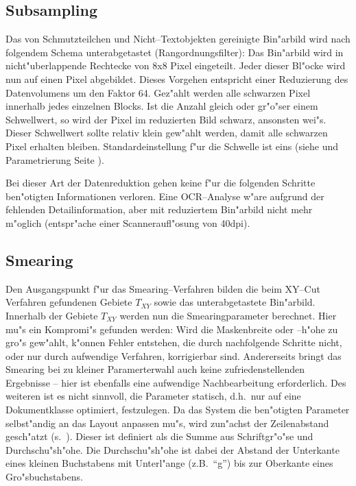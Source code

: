 
\subsection{Subsampling}
Das von Schmutzteilchen und Nicht--Textobjekten gereinigte Bin"arbild wird nach folgendem
Schema unterabgetastet (Rangordnungsfilter):
Das Bin"arbild wird in nicht"uberlappende Rechtecke von 8x8 Pixel eingeteilt.
Jeder dieser Bl"ocke wird nun auf einen Pixel abgebildet. Dieses Vorgehen entspricht einer
Reduzierung des Datenvolumens um den Faktor 64. Gez"ahlt werden alle schwarzen Pixel
innerhalb jedes einzelnen Blocks. Ist die Anzahl gleich oder gr"o"ser einem Schwellwert,
so wird der Pixel im reduzierten Bild schwarz, ansonsten wei"s.
Dieser Schwellwert sollte relativ klein gew"ahlt werden, damit alle schwarzen Pixel
erhalten bleiben. Standardeinstellung f"ur die Schwelle ist eins (siehe 
und Parametrierung  Seite \pageref{eps:ParameterPanelBottomUp}).


Bei dieser Art der Datenreduktion gehen keine f"ur die folgenden Schritte ben"otigten
Informationen verloren. Eine OCR--Analyse w"are aufgrund der fehlenden Detailinformation,
aber mit reduziertem Bin"arbild nicht mehr m"oglich (entspr"ache einer Scanneraufl"osung
von 40dpi).

\subsection{Smearing}
Den Ausgangspunkt f"ur das Smearing--Verfahren bilden die beim XY--Cut Verfahren gefundenen Gebiete
$T_{XY}$ sowie das unterabgetastete Bin"arbild.
Innerhalb der Gebiete $T_{XY}$ werden nun die Smearingparameter
berechnet. Hier mu"s ein Kompromi"s gefunden werden: Wird die Maskenbreite oder --h"ohe zu gro"s
gew"ahlt, k"onnen Fehler entstehen, die durch nachfolgende Schritte nicht, oder nur durch
aufwendige Verfahren, korrigierbar sind. Andererseits bringt das Smearing bei zu kleiner
Paramerterwahl auch keine zufriedenstellenden Ergebnisse -- hier ist ebenfalls eine aufwendige
Nachbearbeitung erforderlich. Des weiteren ist es nicht sinnvoll, die Parameter statisch,
d.h.\ nur auf eine Dokumentklasse optimiert, festzulegen.
Da das System die ben"otigten Parameter selbst"andig an das Layout anpassen mu"s,
wird zun"achst der Zeilenabstand gesch"atzt (s.\ ).
Dieser ist definiert als die Summe aus Schriftgr"o"se und Durchschu"sh"ohe. Die Durchschu"sh"ohe
ist dabei der Abstand der Unterkante eines kleinen Buchstabens mit
Unterl"ange (z.B.\ "`g"') bis zur Oberkante eines Gro"sbuchstabens.

